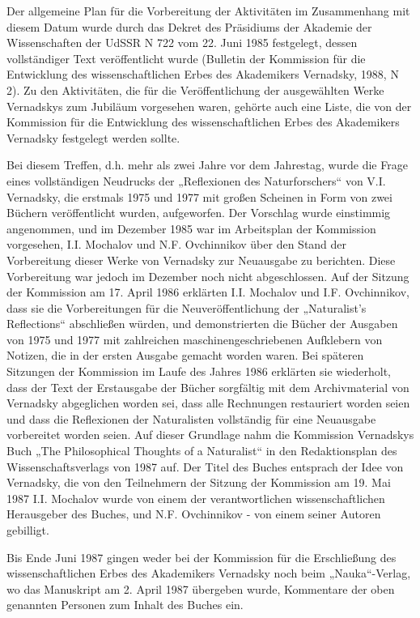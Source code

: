 \documentclass[11pt,a4paper]{article}
\begin{document}
Der allgemeine Plan für die Vorbereitung der Aktivitäten im Zusammenhang mit
diesem Datum wurde durch das Dekret des Präsidiums der Akademie der
Wissenschaften der UdSSR N 722 vom 22. Juni 1985 festgelegt, dessen
vollständiger Text veröffentlicht wurde (Bulletin der Kommission für die
Entwicklung des wissenschaftlichen Erbes des Akademikers Vernadsky, 1988, N
2). Zu den Aktivitäten, die für die Veröffentlichung der ausgewählten Werke
Vernadskys zum Jubiläum vorgesehen waren, gehörte auch eine Liste, die von der
Kommission für die Entwicklung des wissenschaftlichen Erbes des Akademikers
Vernadsky festgelegt werden sollte.

Bei diesem Treffen, d.h. mehr als zwei Jahre vor dem Jahrestag, wurde die
Frage eines vollständigen Neudrucks der „Reflexionen des Naturforschers“ von
V.I. Vernadsky, die erstmals 1975 und 1977 mit großen Scheinen in Form von
zwei Büchern veröffentlicht wurden, aufgeworfen. Der Vorschlag wurde
einstimmig angenommen, und im Dezember 1985 war im Arbeitsplan der Kommission
vorgesehen, I.I. Mochalov und N.F. Ovchinnikov über den Stand der Vorbereitung
dieser Werke von Vernadsky zur Neuausgabe zu berichten. Diese Vorbereitung war
jedoch im Dezember noch nicht abgeschlossen. Auf der Sitzung der Kommission am
17. April 1986 erklärten I.I. Mochalov und I.F. Ovchinnikov, dass sie die
Vorbereitungen für die Neuveröffentlichung der „Naturalist's Reflections“
abschließen würden, und demonstrierten die Bücher der Ausgaben von 1975 und
1977 mit zahlreichen maschinengeschriebenen Aufklebern von Notizen, die in der
ersten Ausgabe gemacht worden waren. Bei späteren Sitzungen der Kommission im
Laufe des Jahres 1986 erklärten sie wiederholt, dass der Text der Erstausgabe
der Bücher sorgfältig mit dem Archivmaterial von Vernadsky abgeglichen worden
sei, dass alle Rechnungen restauriert worden seien und dass die Reflexionen
der Naturalisten vollständig für eine Neuausgabe vorbereitet worden seien. Auf
dieser Grundlage nahm die Kommission Vernadskys Buch „The Philosophical
Thoughts of a Naturalist“ in den Redaktionsplan des Wissenschaftsverlags von
1987 auf. Der Titel des Buches entsprach der Idee von Vernadsky, die von den
Teilnehmern der Sitzung der Kommission am 19. Mai 1987 I.I. Mochalov wurde von
einem der verantwortlichen wissenschaftlichen Herausgeber des Buches, und
N.F. Ovchinnikov - von einem seiner Autoren gebilligt.

Bis Ende Juni 1987 gingen weder bei der Kommission für die Erschließung des
wissenschaftlichen Erbes des Akademikers Vernadsky noch beim „Nauka“-Verlag,
wo das Manuskript am 2. April 1987 übergeben wurde, Kommentare der oben
genannten Personen zum Inhalt des Buches ein.
\end{document}
